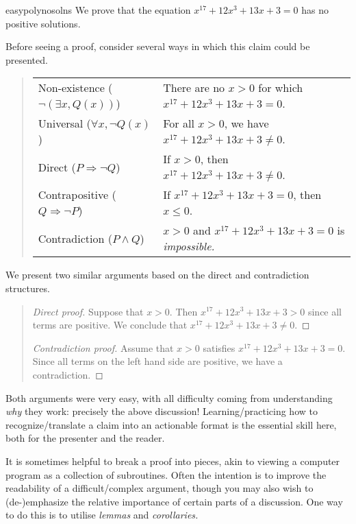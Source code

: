 \begin{example}{}{easypolynosolns}
	We prove that the equation $x^{17}+12x^3+13x+3=0$ has no positive solutions.\medbreak

	Before seeing a proof, consider several ways in which this claim could be presented.
	\begin{quote}
		\def\arraystretch{1.1}
		\begin{tabular}{@{}ll}
			Non-existence ($\neg(\exists x, Q(x))$)& There are no $x>0$ for which $x^{17}+12x^3+13x+3=0$.\\
			Universal ($\forall x,\neg Q(x)$)&For all $x>0$, we have $x^{17}+12x^3+13x+3\neq 0$.\\
			Direct ($P\Rightarrow \neg Q$)&If $x>0$, then $x^{17}+12x^3+13x+3\neq 0$.\\
			Contrapositive ($Q\Rightarrow\neg P$)&If $x^{17}+12x^3+13x+3=0$, then $x\le 0$.\\
			Contradiction ($P\wedge Q$)&$x>0$ and $x^{17}+12x^3+13x+3=0$ is \emph{impossible.}
		\end{tabular}
	\end{quote}
	
	We present two similar arguments based on the direct and contradiction structures.  
	
	\begin{quote}
		\begin{proof}[Direct proof]
		Suppose that $x>0$. Then $x^{17}+12x^3+13x+3>0$ since all terms are positive. We conclude that $x^{17}+12x^3+13x+3\neq 0$.
		\end{proof}
		\begin{proof}[Contradiction proof]
		Assume that $x>0$ satisfies $x^{17}+12x^3+13x+3=0$. Since all terms on the left hand side are positive, we have a contradiction.
		\end{proof}
	\end{quote}
	
	Both arguments were very easy, with all difficulty coming from understanding \emph{why} they work: precisely the above discussion! Learning/practicing how to recognize/translate a claim into an actionable format is the essential skill here, both for the presenter and the reader.
\end{example}



It is sometimes helpful to break a proof into pieces, akin to viewing a computer program as a collection of subroutines. Often the intention is to improve the readability of a difficult/complex argument, though you may also wish to (de-)emphasize the relative importance of certain parts of a discussion. One way to do this is to utilise \emph{lemmas} and \emph{corollaries.}

